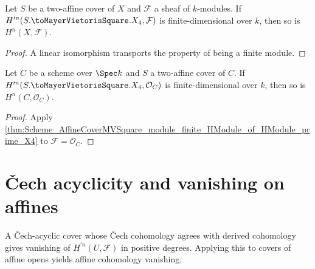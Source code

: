 \begin{theorem}\leanok
  \label{thm:Scheme_AffineCoverMVSquare_module_finite_HModule_of_HModule_prime_X4}

  Let \(S\) be a two-affine cover of \(X\) and \(\mathcal F\) a sheaf of \(k\)-modules. If \(H^{\prime n}(S.\toMayerVietorisSquare.X_4, \mathcal F)\) is finite-dimensional over \(k\), then so is \(H^{n}(X, \mathcal F)\).
\end{theorem}

\begin{proof}


\leanok
  A linear isomorphism transports the property of being a finite module.
\end{proof}

\begin{theorem}\leanok
  \label{thm:Scheme_AffineCoverMVSquare_module_finite_HModule_of_HModule_prime_X4_curve}

  Let \(C\) be a scheme over \(\Spec k\) and \(S\) a two-affine cover of \(C\). If \(H^{\prime n}(S.\toMayerVietorisSquare.X_4, \mathcal O_C)\) is finite-dimensional over \(k\), then so is \(H^{n}(C, \mathcal O_C)\).
\end{theorem}

\begin{proof}


\leanok
  Apply \cref{thm:Scheme_AffineCoverMVSquare_module_finite_HModule_of_HModule_prime_X4} to \(\mathcal F=\mathcal O_C\).
\end{proof}

\section{\v{C}ech acyclicity and vanishing on affines}
\label{sec:cech_acyclicity}

A \v{C}ech-acyclic cover whose \v{C}ech cohomology agrees with derived cohomology gives vanishing of \(H^{\prime n}(U,\mathcal F)\) in positive degrees. Applying this to covers of affine opens yields affine cohomology vanishing.

